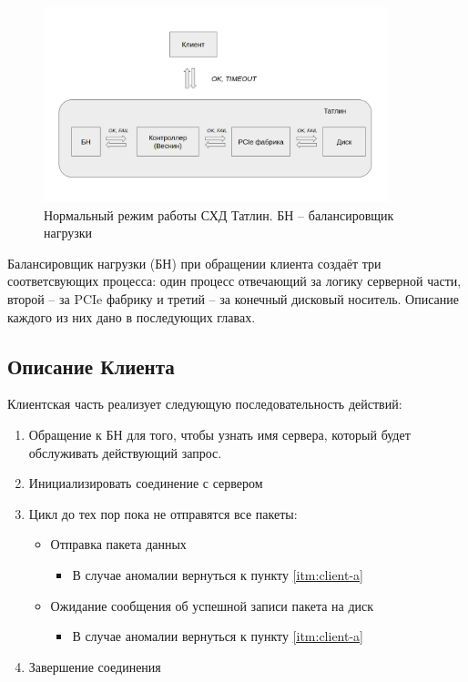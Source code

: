 \begin{figure}[!ht]
\centering
\includegraphics[width=10cm]{Kenenbek/images/norm.png}
\caption{Нормальный режим работы СХД Татлин. БН -- балансировщик нагрузки}
\label{fig:norm-tatlin}
\end{figure}

Балансировщик нагрузки (БН) при обращении клиента создаёт три соответсвующих процесса: один процесс отвечающий за логику серверной части, второй -- за PCIe фабрику и третий -- за конечный дисковый носитель. Описание каждого из них дано в последующих главах.

\subsection{Описание Клиента}
Клиентская часть реализует следующую последовательность действий:

\begin{enumerate}
\item\label{itm:client-a} Обращение к БН для того, чтобы узнать имя сервера, который будет обслуживать действующий запрос. 
\item Инициализировать соединение с сервером 

\item Цикл до тех пор пока не отправятся все пакеты:
	\begin{itemize}
		\item Отправка пакета данных 
			\begin{itemize}
				\item В случае аномалии вернуться к пункту \ref{itm:client-a}
			\end{itemize}
		\item Ожидание сообщения об успешной записи пакета на диск
			\begin{itemize}
				\item В случае аномалии вернуться к пункту \ref{itm:client-a}
			\end{itemize}
	\end{itemize}
\item Завершение соединения
\end{enumerate}



